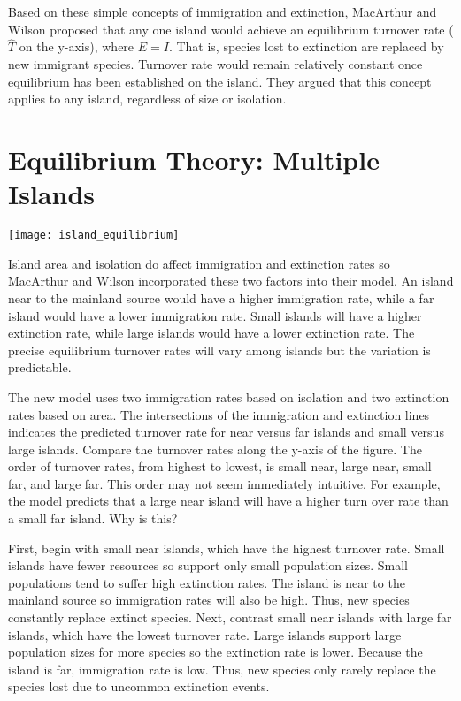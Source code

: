 \documentclass{tufte-handout}
\begin{document}
Based on these simple concepts of immigration and extinction, MacArthur and Wilson proposed that any one island would achieve an equilibrium turnover rate ($\hat{T}$ on the y-axis), where $E=I$. That is, species lost to extinction are replaced by new immigrant species. Turnover rate would remain relatively constant once equilibrium has been established on the island. They argued that this concept applies to any island, regardless of size or isolation.

\section{Equilibrium Theory: Multiple Islands}
\begin{marginfigure}%
	\centering
	\texttt{[image: island\_equilibrium]}
\end{marginfigure} 

Island area and isolation do affect immigration and extinction rates so MacArthur and Wilson incorporated these two factors into their model. An island near to the mainland source would have a higher immigration rate, while a far island would have a lower immigration rate.  Small islands will have a higher extinction rate, while large islands would have a lower extinction rate.  The precise equilibrium turnover rates will vary among islands but the variation is predictable.

The new model uses two immigration rates based on isolation and two extinction rates based on area. The intersections of the immigration and extinction lines indicates the predicted turnover rate for near versus far islands and small versus large islands. Compare the turnover rates along the y-axis of the figure. The order of turnover rates, from highest to lowest, is small near, large near, small far, and large far. This order may not seem immediately intuitive. For example, the model predicts that a large near island will have a higher turn over rate than a small far island.  Why is this?

First, begin with small near islands, which have the highest turnover rate. Small islands have fewer resources so support only small population sizes. Small populations tend to suffer high extinction rates. The island is near to the mainland source so immigration rates will also be high. Thus, new species constantly replace extinct species.  Next, contrast small near islands with large far islands, which have the lowest turnover rate. Large islands support large population sizes for more species so the extinction rate is lower. Because the island is far, immigration rate is low. Thus, new species only rarely replace the species lost due to uncommon extinction events.  
\end{document}

